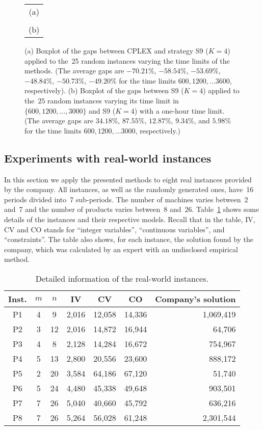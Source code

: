 \documentclass[11pt]{article}
\begin{document}
\begin{figure}[!ht]
\centering
\begin{tabular}[!ht]{c}
\\
(a)\\
\\
(b)
\end{tabular}
\caption{(a) Boxplot of the gaps between CPLEX and strategy S9 ($K=4$) applied to the~25 random instances varying the time limits of the methods. (The average gaps are $-70.21\%$, $-58.54\%$, $-53.69\%$, $-48.84\%$, $-50.73\%$, $-49.20\%$ for the time limits $600, 1200, \dots 3600$, respectively). (b) Boxplot of the gaps between S9 ($K=4$) applied to the~$25$ random instances varying its time limit in $\{600, 1200, \dots, 3000\}$ and S9 ($K=4$) with a one-hour time limit. (The average gaps are $34.18\%$, $87.55\%$, $12.87\%$, $9.34\%$, and $5.98\%$ for the time limits $600, 1200, \dots 3000$, respectively.)}
\label{fig6}
\end{figure}

\subsection{Experiments with real-world instances}

In this section we apply the presented methods to eight real instances provided by the company. All instances, as well as the randomly generated ones, have~16 periods divided into~7 sub-periods. The number of machines varies between~2 and~7 and the number of products varies between~8 and~26. Table~\ref{tab5} shows some details of the instances and their respective models. Recall that in the table, IV, CV and CO stands for ``integer variables'', ``continuous variables'', and ``constraints''. The table also shows, for each instance, the solution found by the company, which was calculated by an expert with an undisclosed empirical method.

\begin{table}[ht!]
\centering
\begin{tabular}{|c|cc|ccc|r|}
\hline
Inst. & $m$ & $n$ & IV & CV & CO & Company's solution\\
\hline
\hline
P1 & 4 &  9 & 2,016 & 12,058 & 14,336 & 1,069,419\\
P2 & 3 & 12 & 2,016 & 14,872 & 16,944 &    64,706\\
P3 & 4 &  8 & 2,128 & 14,284 & 16,672 &   754,967\\
P4 & 5 & 13 & 2,800 & 20,556 & 23,600 &   888,172\\
P5 & 2 & 20 & 3,584 & 64,186 & 67,120 &    51,740\\
P6 & 5 & 24 & 4,480 & 45,338 & 49,648 &   903,501\\
P7 & 7 & 26 & 5,040 & 40,660 & 45,792 &   636,216\\
P8 & 7 & 26 & 5,264 & 56,028 & 61,248 & 2,301,544\\
\hline
\end{tabular}
\caption{Detailed information of the real-world instances.}
\label{tab5}
\end{table}
\end{document}
